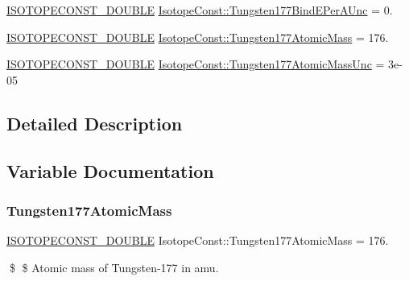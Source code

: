 \begin{DoxyCompactItemize}
\mbox{\hyperlink{group___isotope_const-_macros_ga8f45a7272ce02c0b4c65c44636ed719a}{I\+S\+O\+T\+O\+P\+E\+C\+O\+N\+S\+T\+\_\+\+D\+O\+U\+B\+LE}} \mbox{\hyperlink{group___isotope_const-_tungsten-_w177_ga88cc43ed3814d72cf54d9f70435ac528}{Isotope\+Const\+::\+Tungsten177\+Bind\+E\+Per\+A\+Unc}} = 0.
\item 
\mbox{\hyperlink{group___isotope_const-_macros_ga8f45a7272ce02c0b4c65c44636ed719a}{I\+S\+O\+T\+O\+P\+E\+C\+O\+N\+S\+T\+\_\+\+D\+O\+U\+B\+LE}} \mbox{\hyperlink{group___isotope_const-_tungsten-_w177_ga378d8f74723c81cb9f9efb04dc9fa9a3}{Isotope\+Const\+::\+Tungsten177\+Atomic\+Mass}} = 176.
\item 
\mbox{\hyperlink{group___isotope_const-_macros_ga8f45a7272ce02c0b4c65c44636ed719a}{I\+S\+O\+T\+O\+P\+E\+C\+O\+N\+S\+T\+\_\+\+D\+O\+U\+B\+LE}} \mbox{\hyperlink{group___isotope_const-_tungsten-_w177_gacef71d0682bb938ee742e414da1d5e7a}{Isotope\+Const\+::\+Tungsten177\+Atomic\+Mass\+Unc}} = 3e-\/05
\end{DoxyCompactItemize}


\subsection{Detailed Description}


\subsection{Variable Documentation}
\mbox{\label{group___isotope_const-_tungsten-_w177_ga378d8f74723c81cb9f9efb04dc9fa9a3}} 
\subsubsection{\texorpdfstring{Tungsten177\+Atomic\+Mass}{Tungsten177AtomicMass}}
{\footnotesize\ttfamily \mbox{\hyperlink{group___isotope_const-_macros_ga8f45a7272ce02c0b4c65c44636ed719a}{I\+S\+O\+T\+O\+P\+E\+C\+O\+N\+S\+T\+\_\+\+D\+O\+U\+B\+LE}} Isotope\+Const\+::\+Tungsten177\+Atomic\+Mass = 176.}

\$ \$ Atomic mass of Tungsten-\/177 in amu. \mbox{\label{group___isotope_const-_tungsten-_w177_gacef71d0682bb938ee742e414da1d5e7a}} 
